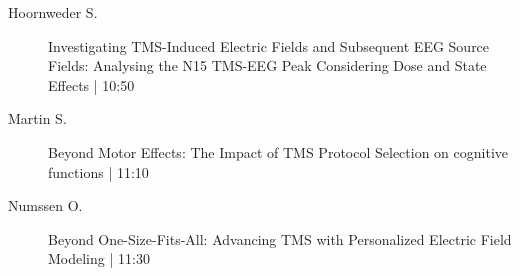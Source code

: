 \begin{symposium}
\begin{description}
                \item [ Hoornweder S.] Investigating TMS-Induced Electric Fields and Subsequent EEG Source Fields: Analysing the N15 TMS-EEG Peak Considering Dose and State Effects \textcolor{mygray}{ | 10:50}    
                
                \item [ Martin S.] Beyond Motor Effects: The Impact of TMS Protocol Selection on cognitive functions \textcolor{mygray}{ | 11:10}    
                
                \item [ Numssen O.] Beyond One-Size-Fits-All: Advancing TMS with Personalized Electric Field Modeling \textcolor{mygray}{ | 11:30}    
                
            \end{description} 
            \end{symposium}
            